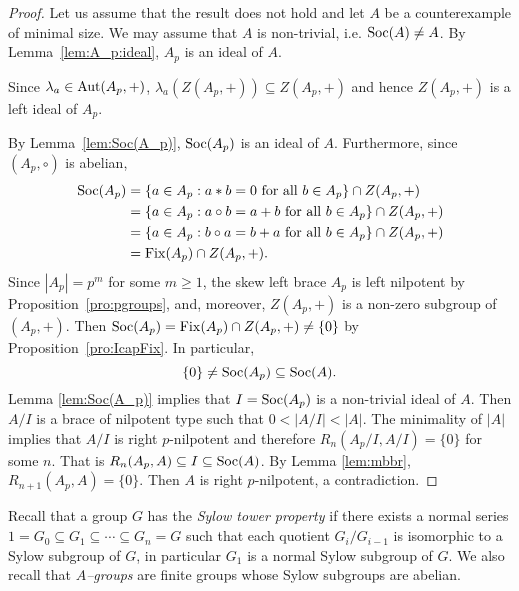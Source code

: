 \begin{proof}
    Let us assume that the result does not hold and let $A$ be a counterexample of minimal size. We may assume that $A$ is non-trivial, i.e. $\operatorname{Soc}(A)\ne A$.
    By Lemma~\ref{lem:A_p:ideal}, $A_p$ is an ideal of $A$.
    
    Since 
    $\lambda_a\in\operatorname{Aut}(A_p,+)$, $\lambda_a(Z(A_p,+))\subseteq Z(A_p,+)$ 
    and hence $Z(A_p,+)$ is a left ideal of $A_p$.
    
    By Lemma~\ref{lem:Soc(A_p)}, $\operatorname{Soc}(A_p)$ is an ideal of $A$. Furthermore, since $(A_p,\circ)$ is abelian, 
    \begin{align*}
    \operatorname{Soc}(A_p)&=\{a\in A_p:a*b=0\text{ for all $b\in A_p$}\}\cap Z(A_p,+)\\
    &=\{a\in A_p:a\circ b=a+b\text{ for all $b\in A_p$}\}\cap Z(A_p,+)\\
    &=\{a\in A_p:b\circ a=b+a\text{ for all $b\in A_p$}\}\cap Z(A_p,+)\\
    &=\operatorname{Fix}(A_p)\cap Z(A_p,+).
    \end{align*}
    Since $|A_p|=p^m$ for some $m\geq1$, the skew left brace $A_p$ is left nilpotent by Proposition~\ref{pro:pgroups}, and, moreover, $Z(A_p,+)$ is a non-zero 
    subgroup of $(A_p,+)$. Then $\operatorname{Soc}(A_p)=\operatorname{Fix}(A_p)\cap Z(A_p,+)\ne\{0\}$ by
    Proposition~\ref{pro:IcapFix}. 
    In particular, 
    \[
    \{0\}\ne \operatorname{Soc}(A_p)\subseteq \operatorname{Soc}(A).
    \]
    Lemma \ref{lem:Soc(A_p)} implies that $I=\operatorname{Soc}(A_p)$ is a non-trivial ideal of $A$. Then $A/I$ is a brace of nilpotent type such that $0<|A/I|<|A|$. 
    The minimality of $|A|$ implies that $A/I$ is right $p$-nilpotent and 
    therefore $R_n(A_p/I,A/I)=\{0\}$ for some $n$. 
    That is $R_n(A_p,A)\subseteq I\subseteq \operatorname{Soc}(A)$. 
    By Lemma \ref{lem:mbbr}, $R_{n+1}(A_p,A)=\{0\}$. Then $A$ is right $p$-nilpotent, a contradiction.
\end{proof}

Recall that a
group $G$ has the \emph{Sylow tower property} if 
there exists a normal series
$1=G_0\subseteq G_1\subseteq\cdots\subseteq G_n=G$ 
such that each quotient $G_i/G_{i-1}$ is isomorphic to a Sylow subgroup of $G$, in particular $G_1$ is a normal Sylow subgroup of $G$. 
We also recall that \emph{$A$--groups} are finite groups whose Sylow subgroups are abelian. 

